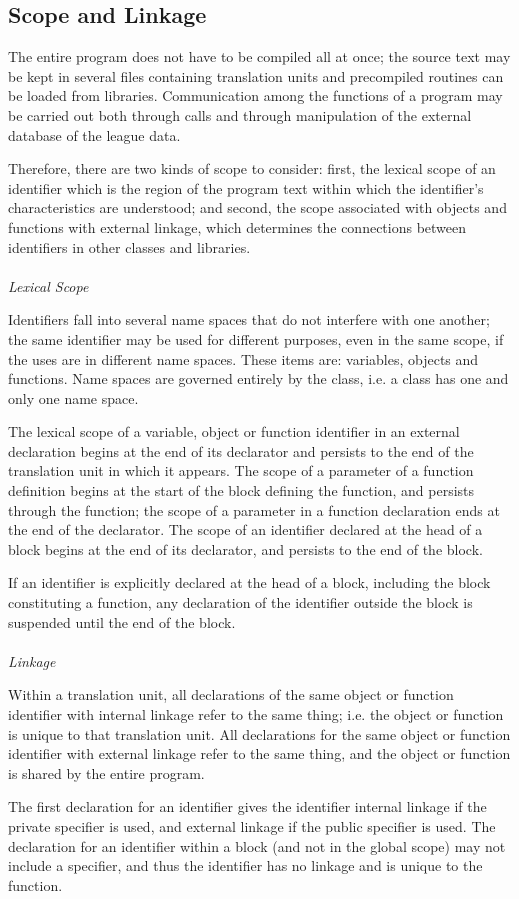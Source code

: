\documentclass[12pt]{report}
\begin{document}
\subsection{Scope and Linkage}
\begin{doublespace}
The entire program does not have to be compiled all at once; the source text may be kept in several files containing translation units and precompiled routines can be loaded from libraries. Communication among the functions of a program may be carried out both through calls and through manipulation of the external database of the league data.

Therefore, there are two kinds of scope to consider: first, the lexical scope of an identifier which is the region of the program text within which the identifier's characteristics are understood; and second, the scope associated with objects and functions with external linkage, which determines the connections between identifiers in other classes and libraries.\\
\\
\textit{Lexical Scope}

Identifiers fall into several name spaces that do not interfere with one another; the same identifier may be used for different purposes, even in the same scope, if the uses are in different name spaces. These items are: variables, objects and functions. Name spaces are governed entirely by the class, i.e. a class has one and only one name space.

The lexical scope of a variable, object or function identifier in an external declaration begins at the end of its declarator and persists to the end of the translation unit in which it appears. The scope of a parameter of a function definition begins at the start of the block defining the function, and persists through the function; the scope of a parameter in a function declaration ends at the end of the declarator. The scope of an identifier declared at the head of a block begins at the end of its declarator, and persists to the end of the block. 

If an identifier is explicitly declared at the head of a block, including the block constituting a function, any declaration of the identifier outside the block is suspended until the end of the block.\\
\\
\textit{Linkage}

Within a translation unit, all declarations of the same object or function identifier with internal linkage refer to the same thing; i.e. the object or function is unique to that translation unit. All declarations for the same object or function identifier with external linkage refer to the same thing, and the object or function is shared by the entire program.

The first declaration for an identifier gives the identifier internal linkage if the private specifier is used,  and external linkage if the public specifier is used. The declaration for an identifier within a block (and not in the global scope) may not include a specifier, and thus the identifier has no linkage and is unique to the function. 
\end{doublespace}
\end{document}
